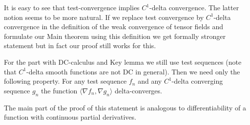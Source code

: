 It is easy to see that test-convergence implies $C^1$-delta convergence.
The latter notion seems to be more natural.
If we replace test convergence
by $C^1$-delta convergence
in the definition of the weak convergence of tensor fields and
formulate our Main theorem using this definition we get formally stronger
statement but in fact our proof 
still works for this.

For the part with DC-calculus and 
Key lemma we still use test sequences
(note that $C^1$-delta smooth functions are not DC in general).
Then we need only
the following property. 
For any test sequence $f_n$
and any $C^1$-delta converging
sequence $g_n$ the function
$\langle \nabla f_n , \nabla g_n
\rangle$ delta-converges.



The main part of the proof of this statement is analogous to differentiability of a function with continuous partial derivatives. 
